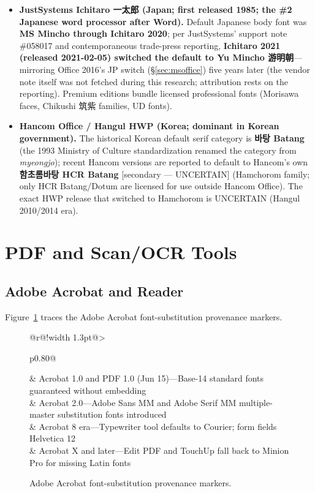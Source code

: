 \documentclass[10pt,a4paper]{article}
\makeatletter
\newcommand{\ja}[1]{{\japanesefont #1}}
\newcommand{\ko}[1]{{\koreanfont #1}}
\newcommand{\fpyear}[1]{%
  \tikz[baseline=(fpy.base)]{\node[fill=fpspine,text=white,rounded corners=2pt,
    inner sep=2.5pt,font=\footnotesize\bfseries] (fpy) {#1};}}
\newenvironment{fptimeline}[1][0.80\textwidth]{%
  \renewcommand{\arraystretch}{1.3}%
  \begin{tabular}{@{}r@{\hspace{6pt}}!{{\color{fpspine}\vrule width 1.3pt}}@{\hspace{9pt}}>{\raggedright\arraybackslash}p{#1}@{}}}%
  {\end{tabular}}
\newcommand{\fpevent}[2]{\fpyear{#1} & #2\\}
\makeatother
\begin{document}
\begin{itemize}[leftmargin=1.2em,itemsep=2pt]
\item \textbf{JustSystems Ichitaro 一太郎 (Japan; first released 1985; the \#2 Japanese
word processor after Word).} Default Japanese body font was \textbf{MS Mincho through
Ichitaro 2020}; per JustSystems' support note \#058017 and contemporaneous trade-press
reporting, \textbf{Ichitaro 2021 (released 2021-02-05) switched the default to Yu Mincho
\ja{游明朝}}---mirroring Office 2016's JP switch (\S\ref{sec:msoffice}) five years later
(the vendor note itself was not fetched during this research; attribution rests on the
reporting). Premium editions bundle licensed professional fonts (Morisawa faces,
Chikushi 筑紫 families, UD fonts).\cite{s-ichitaro,s-ichitaro-2,s-ichitaro-3}
\item \textbf{Hancom Office / Hangul HWP (Korea; dominant in Korean government).} The
historical Korean default serif category is \textbf{\ko{바탕} Batang} (the 1993 Ministry
of Culture standardization renamed the category from \emph{myeongjo}); recent Hancom
versions are reported to default to Hancom's own \textbf{\ko{함초롬바탕} HCR Batang}
[secondary --- UNCERTAIN] (Hamchorom family;
only HCR Batang/Dotum are licensed for use outside Hancom Office). The exact HWP release
that switched to Hamchorom is UNCERTAIN (Hangul 2010/2014 era).\cite{s-hancom,s-hancom-2}
\end{itemize}

\section{PDF and Scan/OCR Tools}\label{sec:pdf}

\subsection{Adobe Acrobat and Reader}\label{sec:acrobat}

Figure~\ref{fig:acrobat} traces the Adobe Acrobat font-substitution provenance markers.

\begin{figure}[t]
\centering
\begin{fptimeline}
\fpevent{1993}{Acrobat 1.0 and PDF 1.0 (Jun 15)---Base-14 standard fonts guaranteed without embedding}
\fpevent{1994}{Acrobat 2.0---Adobe Sans MM and Adobe Serif MM multiple-master substitution fonts introduced}
\fpevent{2006}{Acrobat 8 era---Typewriter tool defaults to Courier; form fields Helvetica 12}
\fpevent{2011}{Acrobat X and later---Edit PDF and TouchUp fall back to Minion Pro for missing Latin fonts}
\end{fptimeline}
\caption{Adobe Acrobat font-substitution provenance markers.}
\label{fig:acrobat}
\end{figure}
\end{document}
